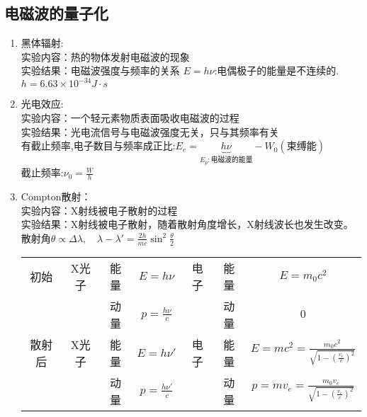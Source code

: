 \documentclass{article}
\renewcommand\var[1]{\Delta#1}
\begin{document}
\subsection{电磁波的量子化}
\begin{enumerate}[label=(\arabic*)]
	\item 黑体辐射:\\
				实验内容：热的物体发射电磁波的现象\\
				实验结果：电磁波强度与频率的关系
				$E=h\nu$:电偶极子的能量是不连续的.$h=6.63\times 10^{-34}\si{J\cdot s}$
	\item 光电效应:\\
				实验内容：一个轻元素物质表面吸收电磁波的过程\\
				实验结果：光电流信号与电磁波强度无关，只与其频率有关\\
				有截止频率,电子数目与频率成正比:$E_e=\underbrace{h\nu }_{E_p:\text{电磁波的能量}}-W_0(\text{束缚能})$\\
				截止频率:$\nu_0=\frac{W}{h}$
	\item Compton散射：\\
				实验内容：X射线被电子散射的过程\\
				实验结果：X射线被电子散射，随着散射角度增长，X射线波长也发生改变。散射角$\theta \propto \var\lambda,\quad \lambda-\lambda'=\frac{2h}{mc}\sin ^2 \frac{\theta}{2}$
				\begin{figure}[H]
					\centering
				\end{figure}
				\begin{tabular}{cccc|ccc}
					初始 & X光子 & 能量 & $E=h\nu$ & 电子 & 能量 & $E=m_0c^2$ \\
							&       & 动量 & $p=\frac{h\nu}{c}$ & & 动量 & $0$ \\
					散射后 & X光子 & 能量 & $E=h\nu'$ & 电子 & 能量 & $E=mc^2=\frac{m_0c^2}{\sqrt{1-(\frac{v_e}{c})^2}}$ \\
								&       & 动量 & $p=\frac{h\nu'}{c}$ & & 动量 & $p=mv_e=\frac{m_0v_e}{\sqrt{1-(\frac{v_e}{c})^2}}$ \\

\end{tabular}
\end{enumerate}
\end{document}
